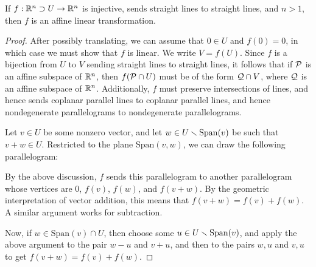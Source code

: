 \begin{theorem} \label{thm:geometric_algebra}
  If $f:\mathbb{R}^n\supset U\to\mathbb{R}^n$ is injective, sends straight 
  lines to straight lines, and $n>1$, then $f$ is an affine linear 
  transformation.
\end{theorem}
\begin{proof}
  After possibly translating, we can assume that 
  $0\in U$ and $f(0) = 0$, in which 
  case we must show that $f$ is linear. We write $V = f(U)$. 
  Since $f$ is a bijection from $U$ to $V$ 
  sending straight lines to straight lines, it follows that 
  if $\mathcal{P}$ is an affine subspace of $\mathbb{R}^n$, then 
  $f(\mathcal{P}\cap U)$ must be of the form $\mathcal{Q}\cap V$, where 
  $\mathcal{Q}$ is an affine subspace of $\mathbb{R}^n$.
  Additionally, $f$ must preserve intersections of 
  lines, and hence sends coplanar parallel lines to coplanar 
  parallel lines, and hence nondegenerate parallelograms 
  to nondegenerate parallelograms.

  Let $v\in U$ be some nonzero vector, and let 
  $w\in U\smallsetminus \mathrm{Span}(v)$ be such that 
  $v+w\in U$.
  Restricted to the plane $\mathrm{Span}(v,w)$, 
  we can draw the following parallelogram:
  \begin{figure}
    \centering
  \end{figure}
  By the above discussion, $f$ sends this parallelogram 
  to another parallelogram whose vertices are 
  $0$, $f(v)$, $f(w)$, and $f(v+w)$. By the geometric 
  interpretation of vector addition, this means that 
  $f(v+w) = f(v)+f(w)$. A similar argument works for 
  subtraction.

  Now, if $w\in \mathrm{Span}(v)\cap U$, then choose some 
  $u\in U\smallsetminus \mathrm{Span}(v)$, and apply the above argument to 
  the pair $w-u$ and $v+u$, and then to the pairs 
  $w,u$ and $v,u$ to get $f(v+w) = f(v) + f(w)$.


\end{proof}
